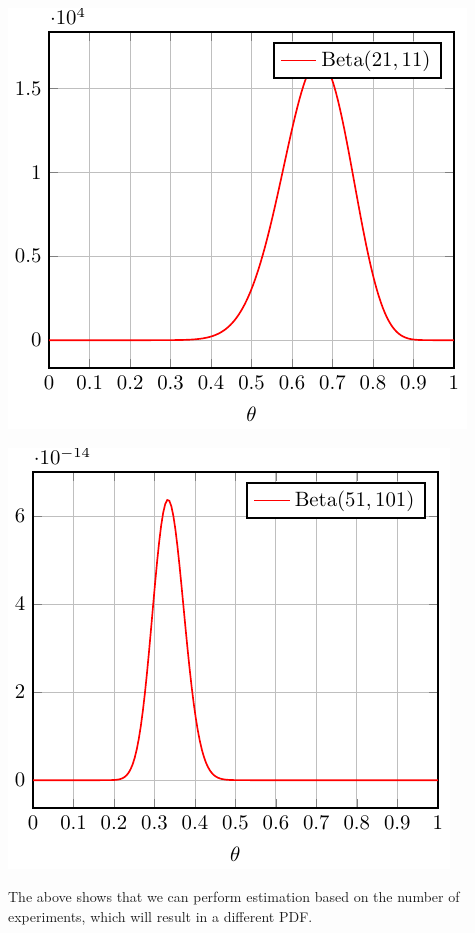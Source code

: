 \begin{minipage}{0.5\textwidth}
  \includegraphics{Figures/Beta_21_11.pdf}
\end{minipage}
\begin{minipage}{0.5\textwidth}
  \includegraphics{Figures/Beta_51_101.pdf}
\end{minipage}

The above shows that we can perform estimation based on the number of experiments, which will result in a different PDF.


